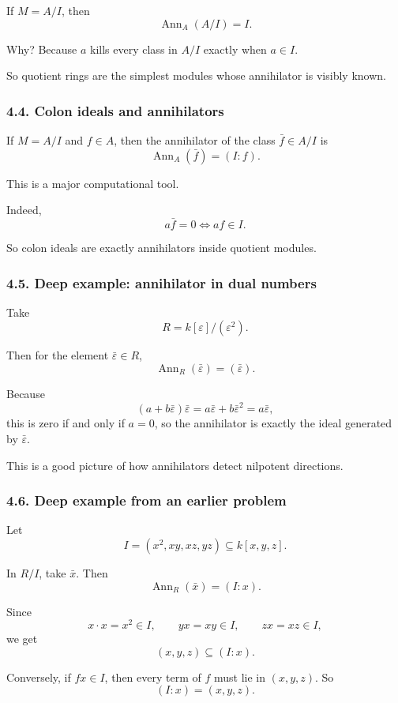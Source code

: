\documentclass[12pt,a4paper]{article}
\theoremstyle{plain}
\theoremstyle{definition}      %
\begin{document}
	If \(M=A/I\), then
	\[
	\operatorname{Ann}_A(A/I)=I.
	\]
	
	Why? Because \(a\) kills every class in \(A/I\) exactly when \(a\in I\).
	
	So quotient rings are the simplest modules whose annihilator is visibly known.
	
	\subsubsection*{4.4. Colon ideals and annihilators}
	
	If \(M=A/I\) and \(f\in A\), then the annihilator of the class \(\bar f\in A/I\) is
	\[
	\operatorname{Ann}_A(\bar f)=(I:f).
	\]
	
	This is a major computational tool.
	
	Indeed,
	\[
	a\bar f=0 \iff af\in I.
	\]
	
	So colon ideals are exactly annihilators inside quotient modules.
	
	\subsubsection*{4.5. Deep example: annihilator in dual numbers}
	
	Take
	\[
	R=k[\varepsilon]/(\varepsilon^2).
	\]
	
	Then for the element \(\bar\varepsilon\in R\),
	\[
	\operatorname{Ann}_R(\bar\varepsilon)=(\bar\varepsilon).
	\]
	
	Because
	\[
	(a+b\bar\varepsilon)\bar\varepsilon
	=
	a\bar\varepsilon+b\bar\varepsilon^2
	=
	a\bar\varepsilon,
	\]
	this is zero if and only if \(a=0\), so the annihilator is exactly the ideal generated by \(\bar\varepsilon\).
	
	This is a good picture of how annihilators detect nilpotent directions.
	
	\subsubsection*{4.6. Deep example from an earlier problem}
	
	Let
	\[
	I=(x^2,xy,xz,yz)\subseteq k[x,y,z].
	\]
	
	In \(R/I\), take \(\bar x\). Then
	\[
	\operatorname{Ann}_R(\bar x)=(I:x).
	\]
	
	Since
	\[
	x\cdot x=x^2\in I,\qquad yx=xy\in I,\qquad zx=xz\in I,
	\]
	we get
	\[
	(x,y,z)\subseteq (I:x).
	\]
	
	Conversely, if \(fx\in I\), then every term of \(f\) must lie in \((x,y,z)\). So
	\[
	(I:x)=(x,y,z).
	\]
	
\end{document}
